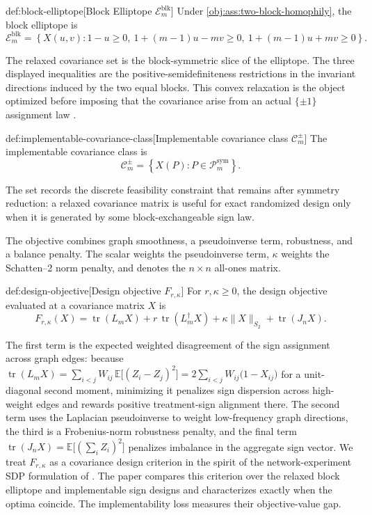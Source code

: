 \begin{definitionv}{def:block-elliptope}[Block Elliptope \(\mathcal E_m^{\mathrm{blk}}\)]
Under \cref{obj:ass:two-block-homophily}, the block elliptope is
\[
\mathcal E_m^{\mathrm{blk}}
=
\left\{
X(u,v):
1-u\ge 0,\ 
1+(m-1)u-mv\ge 0,\ 
1+(m-1)u+mv\ge 0
\right\}.
\]
\end{definitionv}

The relaxed covariance set  is the block-symmetric slice of the elliptope. The three displayed inequalities are the positive-semidefiniteness restrictions in the invariant directions induced by the two equal blocks. This convex relaxation is the object optimized before imposing that the covariance arise from an actual \(\{\pm1\}\) assignment law \citep{boyd2004,thiyageswaran2026}.

\begin{definitionv}{def:implementable-covariance-class}[Implementable covariance class $\mathcal C_m^{\pm}$]
The implementable covariance class is
\[
\mathcal C_m^{\pm}
=
\left\{
X(P): P\in \mathcal P_m^{\mathrm{sym}}
\right\}.
\]
\end{definitionv}

The set  records the discrete feasibility constraint that remains after symmetry reduction: a relaxed covariance matrix is useful for exact randomized design only when it is generated by some block-exchangeable sign law.

The objective combines graph smoothness, a pseudoinverse term, robustness, and a balance penalty. The scalar \leanref{sym:r}{\ensuremath{r}} weights the pseudoinverse term, \(\kappa\) weights the Schatten--2 norm penalty, and \leanref{sym:J_n}{\ensuremath{J_n}} denotes the \(n\times n\) all-ones matrix.

\begin{definitionv}{def:design-objective}[Design objective $F_{r,\kappa}$]
For $r,\kappa\ge 0$, the design objective evaluated at a covariance matrix $X$ is
\[
F_{r,\kappa}(X)
=
\operatorname{tr}(L_m X)
+
r\,\operatorname{tr}(L_m^\dagger X)
+
\kappa \|X\|_{S_2}
+
\operatorname{tr}(J_n X).
\]
\end{definitionv}

The first term is the expected weighted disagreement of the sign assignment across graph edges: because $\operatorname{tr}(L_m X)=\sum_{i<j}W_{ij}\,\mathbb E\bigl[(Z_i-Z_j)^2\bigr]=2\sum_{i<j}W_{ij}\bigl(1-X_{ij}\bigr)$ for a unit-diagonal second moment, minimizing it penalizes sign dispersion across high-weight edges and rewards positive treatment-sign alignment there. The second term uses the Laplacian pseudoinverse to weight low-frequency graph directions, the third is a Frobenius-norm robustness penalty, and the final term $\operatorname{tr}(J_n X)=\mathbb E\bigl[(\sum_i Z_i)^2\bigr]$ penalizes imbalance in the aggregate sign vector. We treat $F_{r,\kappa}$ as a covariance design criterion in the spirit of the network-experiment SDP formulation of \citet{thiyageswaran2026}. The paper compares this criterion over the relaxed block elliptope and implementable sign designs and characterizes exactly when the optima coincide. The implementability loss measures their objective-value gap.

